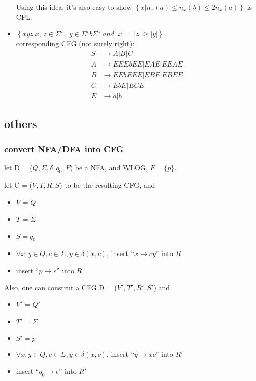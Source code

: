 \documentclass{article}
\begin{document}
\begin{itemize}
            Using this idea, it's also easy to show $\left\{ x | n_{x}(a) \leq n_{x}(b) \leq 2n_{x}(a) \right\}$ is CFL.

        \item $\left\{xyz|x,\,z\in \Sigma^\star ,\; y\in \Sigma^\star b \Sigma^\star \; and \; |x|=|z|\geq |y|\right\}$ \\ corresponding CFG (not surely right):
            \begin{align*}
                S & \rightarrow A|B|C\\
                A & \rightarrow EEEbEE | EAE | EEAE \\ 
                B & \rightarrow EEbEEE | EBE | EBEE \\
                C & \rightarrow EbE | ECE\\
                E & \rightarrow a|b
            \end{align*}
        \end{itemize}
\subsection{others}

\subsubsection{convert NFA/DFA into CFG}
    let D = ($Q, \Sigma, \delta, q_{0}, F$) be a NFA, and WLOG, $F = \{p\}$.
    
    let C = ($V, T, R, S$) to be the resulting CFG, and
    \begin{itemize}
        \item $V$ = $Q$ 
        \item  $T$ = $\Sigma$ 
        \item $S = q_{0}$
        \item $\forall x, y \in Q, c \in \Sigma, y\in \delta(x, c)$, insert ``$x \rightarrow cy$'' into $R$ 
        \item insert ``$p \rightarrow \epsilon$'' into $R$
    \end{itemize}

    Also, one can construt a CFG D = ($V', T', R', S'$) and
    \begin{itemize}
        \item $V'$ = $Q'$ 
        \item  $T'$ = $\Sigma$ 
        \item $S' = p$
        \item $\forall x, y \in Q, c \in \Sigma, y\in \delta(x, c)$, insert ``$y \rightarrow xc$'' into $R'$ 
        \item insert ``$q_{0} \rightarrow \epsilon$'' into $R'$
    \end{itemize}
\end{document}

